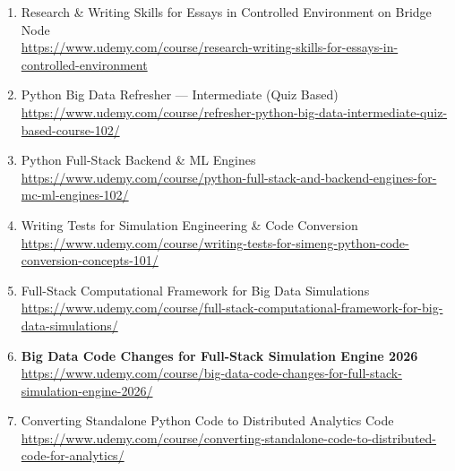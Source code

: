 \documentclass[12pt]{article}
\begin{document}
\begin{enumerate}[label=\textbf{Course \arabic*:}]
		\item Research \& Writing Skills for Essays in Controlled Environment on Bridge Node\\
		\href{https://www.udemy.com/course/research-writing-skills-for-essays-in-controlled-environment}
		{https://www.udemy.com/course/research-writing-skills-for-essays-in-controlled-environment}
		
		\item Python Big Data Refresher — Intermediate (Quiz Based) \\
		\href{https://www.udemy.com/course/refresher-python-big-data-intermediate-quiz-based-course-102/}
		{https://www.udemy.com/course/refresher-python-big-data-intermediate-quiz-based-course-102/}
		
		\item Python Full-Stack Backend \& ML Engines \\
		\href{https://www.udemy.com/course/python-full-stack-and-backend-engines-for-mc-ml-engines-102/}
		{https://www.udemy.com/course/python-full-stack-and-backend-engines-for-mc-ml-engines-102/}
		
		\item Writing Tests for Simulation Engineering \& Code Conversion \\
		\href{https://www.udemy.com/course/writing-tests-for-simeng-python-code-conversion-concepts-101/}
		{https://www.udemy.com/course/writing-tests-for-simeng-python-code-conversion-concepts-101/}
		
		\item Full-Stack Computational Framework for Big Data Simulations \\
		\href{https://www.udemy.com/course/full-stack-computational-framework-for-big-data-simulations/}
		{https://www.udemy.com/course/full-stack-computational-framework-for-big-data-simulations/}
		
		\item \textbf{Big Data Code Changes for Full-Stack Simulation Engine 2026} \\
		\href{https://www.udemy.com/course/big-data-code-changes-for-full-stack-simulation-engine-2026/}
		{https://www.udemy.com/course/big-data-code-changes-for-full-stack-simulation-engine-2026/}
		
		\item Converting Standalone Python Code to Distributed Analytics Code \\
		\href{https://www.udemy.com/course/converting-standalone-code-to-distributed-code-for-analytics/}
		{https://www.udemy.com/course/converting-standalone-code-to-distributed-code-for-analytics/}
	\end{enumerate}
	
\end{document}
